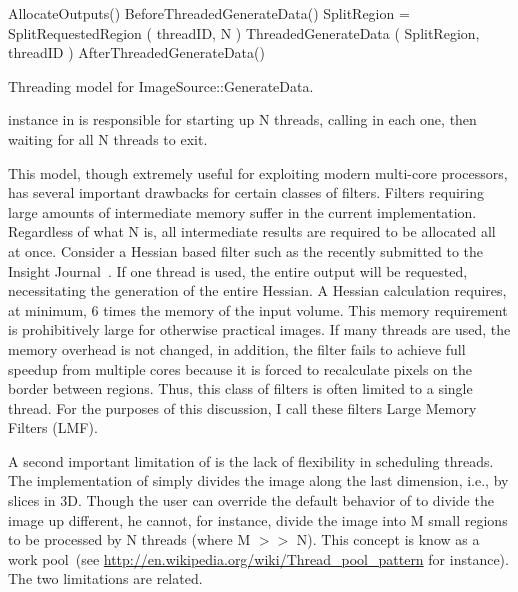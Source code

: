 \documentclass{InsightArticle}
\begin{document}
\begin{algorithm}
  \begin{algorithmic}
    \STATE AllocateOutputs() 
    \STATE BeforeThreadedGenerateData() 
      \STATE  {}
      \STATE SplitRegion = SplitRequestedRegion ( threadID, N )
      \STATE  {}
      \STATE ThreadedGenerateData ( SplitRegion, threadID )
    \ENDFOR %
    \STATE AfterThreadedGenerateData() 
  \end{algorithmic}
  \caption{Threading model for ImageSource::GenerateData.  \label{A:ImageSource}}
\end{algorithm}

 instance in  is responsible for starting up N threads, calling  in each one, then waiting for all N threads to exit.

This model, though extremely useful for exploiting modern multi-core processors, has several important drawbacks for certain classes of filters.  Filters requiring large amounts of intermediate memory suffer in the current implementation.  Regardless of what N is, all intermediate results are required to be allocated all at once.  Consider a Hessian based filter such as the  recently submitted to the Insight Journal~\cite{Antiga2007}.  If one thread is used, the entire output will be requested, necessitating the generation of the entire Hessian.  A Hessian calculation requires, at minimum, 6 times the memory of the input volume.  This memory requirement is prohibitively large for otherwise practical images.  If many threads are used, the memory overhead is not changed, in addition, the filter fails to achieve full speedup from multiple cores because it is forced to recalculate pixels on the border between regions.  Thus, this class of filters is often limited to a single thread.  For the purposes of this discussion, I call these filters Large Memory Filters (LMF).

A second important limitation of  is the lack of flexibility in scheduling threads.  The implementation of  simply divides the image along the last dimension, i.e., by slices in 3D.  Though the user can override the default behavior of  to divide the image up different, he cannot, for instance, divide the image into M small regions to be processed by N threads (where M $>>$ N).  This concept is know as a work pool~(see \url{http://en.wikipedia.org/wiki/Thread_pool_pattern} for instance).  The two limitations are related.
\end{document}

